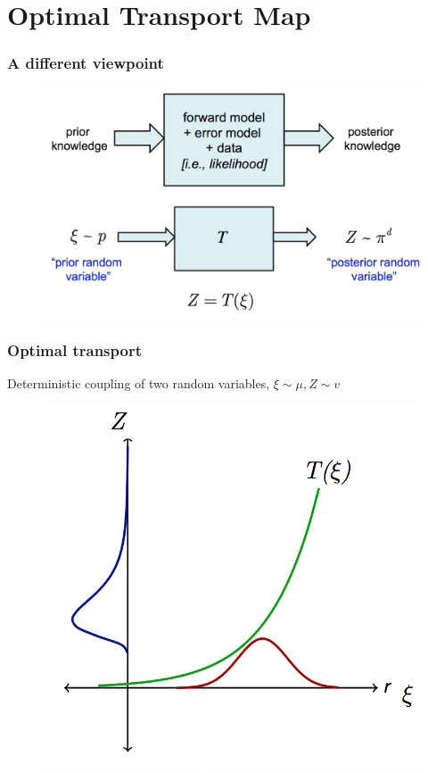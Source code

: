 \documentclass[table]{beamer}
\begin{document}
\begin{CJK}{UTF8}{gbsn}
\begin{frame}
\end{frame}

\section{Optimal Transport Map}

\begin{frame}
  \frametitle{A different viewpoint}

\begin{figure}
\includegraphics[scale=0.2]{img/viewpoint.png}
\end{figure}
\end{frame}


\begin{frame}
  \frametitle{Optimal transport}
Deterministic coupling of two random variables, $\xi \sim \mu, Z \sim v$
\begin{figure}
\includegraphics[scale=0.2]{img/optimaltransportmap.png}
\end{figure}


\end{frame}
\end{CJK}
\end{document}
